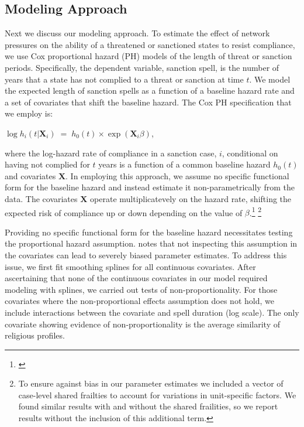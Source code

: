 
\subsection*{Modeling Approach} 

Next we discuss our modeling approach. To estimate the effect of network pressures on the ability of a threatened or sanctioned states to resist compliance, we use Cox proportional hazard (PH) models of the length of threat or sanction periods. Specifically, the dependent variable, sanction spell, is the number of years that a state has not complied to a threat or sanction at time $t$. We model the expected length of sanction spells as a function of a baseline hazard rate and a set of covariates that shift the baseline hazard. The Cox PH specification that we employ is:

\begin{center}
	$\log h_{i}(t | \boldsymbol{X}_{i}) \; = \; h_{0}(t) \times \exp(\boldsymbol{X}_{i} \beta)$,
\end{center}

where the log-hazard rate of compliance in a sanction case, $i$, conditional on having not complied for $t$ years is a function of a common baseline hazard $h_{0}(t)$ and covariates $\boldsymbol{X}$. In employing this approach, we assume no specific functional form for the baseline hazard and instead estimate it non-parametrically from the data. The covariates $\boldsymbol{X}$ operate multiplicatevely on the hazard rate, shifting the expected risk of compliance up or down depending on the value of $\beta$.\footnote{\citep{crespo2013political}} \footnote{To ensure against bias in our parameter estimates we included a vector of case-level shared frailties to account for variations in unit-specific factors. We found similar results with and without the shared frailities, so we report results without the inclusion of this additional term.} 

Providing no specific functional form for the baseline hazard necessitates testing the proportional hazard assumption. \citet{keele2010proportionally} notes that not inspecting this assumption in the covariates can lead to severely biased parameter estimates. To address this issue, we first fit smoothing splines for all continuous covariates. After ascertaining that none of the continuous covariates in our model required modeling with splines, we carried out tests of non-proportionality. For those covariates where the non-proportional effects assumption does not hold, we include interactions between the covariate and spell duration (log scale). The only covariate showing evidence of non-proportionality is the average similarity of religious profiles.

